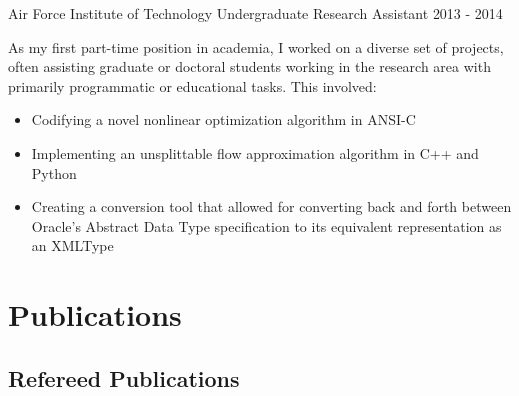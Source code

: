 \documentclass[11pt,a4paper,sans]{moderncv} %
\begin{document}
			 {Air Force Institute of Technology}
			 {Undergraduate Research Assistant}
			 {2013 - 2014}{}{\vspace{3pt}
As my first part-time position in academia, I worked on a diverse set of projects, often assisting graduate or doctoral students working in the research area with primarily programmatic or educational tasks. This involved: 
\begin{itemize}
	\item Codifying a novel nonlinear optimization algorithm in ANSI-C
	\item Implementing an unsplittable flow approximation algorithm in C++ and Python
	\item Creating a conversion tool that allowed for converting back and forth between Oracle's Abstract Data Type specification to its equivalent representation as an XMLType 
\end{itemize}	
}
\section{Publications}

\subsection{\Large Refereed Publications}





\end{document}
